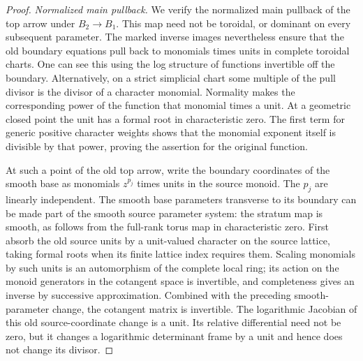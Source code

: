 \begin{proof}
\smallskip\noindent\emph{Normalized main pullback.}
We verify the normalized main pullback of the top arrow under
\(B_2\to B_1\).  This map need not be toroidal, or dominant on every
subsequent parameter.  The marked inverse images nevertheless ensure
that the old boundary equations pull back to monomials times units in
complete toroidal charts.  One can see this using the log structure of
functions invertible off the boundary.  Alternatively, on a strict
simplicial chart some multiple of the pull divisor is the divisor of a
character monomial.  Normality makes the corresponding power of the
function that monomial times a unit.  At a geometric closed point the
unit has a formal root in characteristic zero.  The first term for
generic positive character weights shows that the monomial exponent
itself is divisible by that power, proving the assertion for the
original function.

At such a point of the old top arrow, write the boundary coordinates of
the smooth base as monomials \(z^{p_j}\) times units in the source
monoid.  The \(p_j\) are linearly independent.  The smooth base
parameters transverse to its boundary can be made part of the smooth
source parameter system: the stratum map is smooth, as follows from
the full-rank torus map in characteristic zero.  First absorb the old
source units by a unit-valued character on the source lattice, taking
formal roots when its finite lattice index requires them.  Scaling
monomials by such units is an automorphism of the complete local ring;
its action on the monoid generators in the cotangent space is
invertible, and completeness gives an inverse by successive
approximation.  Combined with the preceding smooth-parameter change,
the cotangent matrix is invertible.  The logarithmic Jacobian of this
old source-coordinate change is a unit.  Its relative differential
need not be zero, but it changes a logarithmic determinant frame by a
unit and hence does not change its divisor.


\end{proof}
